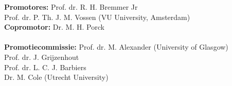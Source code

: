 


\noindent\textbf{Promotores:}
\tabto{7.5em}Prof. dr. R. H. Bremmer Jr\\
\tabto{7.5em}Prof. dr. P. Th. J. M. Vossen (VU University, Amsterdam)\\
\noindent\textbf{Copromotor:}
\tabto{7.5em}Dr. M. H. Porck\\
\\
\noindent\textbf{Promotiecommissie:}
\tabto{11em}Prof. dr. M. Alexander (University of Glasgow)\\
\tabto{11em}Prof. dr. J. Grijzenhout\\
\tabto{11em}Prof. dr. L. C. J. Barbiers\\
\tabto{11em}Dr. M. Cole (Utrecht University)\\




\clearpage